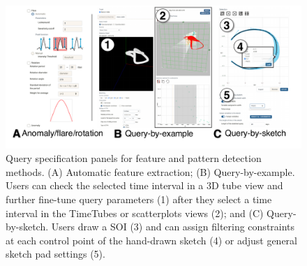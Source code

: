 \begin{figure}[t]
    \begin{minipage}{\columnwidth}
        \begin{center}
            \includegraphics[width=.99\linewidth]{vgtc_journal_latex/figures/QuerySpecificationPanel.pdf}
        \end{center}
        \begin{minipage}{\columnwidth}
        \caption{Query specification panels for feature and pattern detection methods. (A) Automatic feature extraction; (B) Query-by-example. Users can check the selected time interval in a 3D tube view and further fine-tune query parameters (1) after they select a time interval in the TimeTubes or scatterplots views (2);
         and (C) Query-by-sketch. Users draw a SOI (3) and can assign filtering constraints at each control point of the hand-drawn sketch (4) or adjust general sketch pad settings (5).}
        \label{fig:querySpecificationPanel}
        \end{minipage}
    \end{minipage}
\end{figure}
